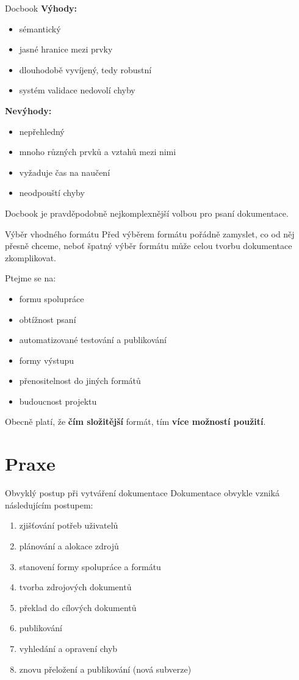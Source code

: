\documentclass[12pt]{beamer}
\begin{document}
	\begin{frame}{Docbook}
	\textbf{Výhody:}
	\begin{itemize}
		\item sémantický
		\item jasné hranice mezi prvky
		\item dlouhodobě vyvíjený, tedy robustní
		\item systém validace nedovolí chyby
	\end{itemize}	
	\textbf{Nevýhody:}
	\begin{itemize}
		\item nepřehledný
		\item mnoho různých prvků a vztahů mezi nimi
		\item vyžaduje čas na naučení
		\item neodpouští chyby
	\end{itemize}				
	Docbook je pravděpodobně nejkomplexnější volbou pro psaní dokumentace.
	\end{frame}

	\begin{frame}{Výběr vhodného formátu}
	Před výběrem formátu pořádně zamyslet, co od něj přesně chceme, neboť špatný výběr formátu může celou tvorbu dokumentace zkomplikovat.

	Ptejme se na:
	
	\begin{itemize}
		\item formu spolupráce
		\item obtížnost psaní
		\item automatizované testování a publikování
		\item formy výstupu
		\item přenositelnost do jiných formátů
		\item budoucnost projektu
	\end{itemize}
	Obecně platí, že \textbf{čím složitější} formát, tím \textbf{více možností použití}.
	\end{frame}

	\section{Praxe}	

	\begin{frame}{Obvyklý postup při vytváření dokumentace}
	Dokumentace obvykle vzniká následujícím postupem:
			\begin{enumerate}
				\item zjišťování potřeb uživatelů
				\item plánování a alokace zdrojů
				\item stanovení formy spolupráce a formátu
				\item tvorba zdrojových dokumentů
				\item překlad do cílových dokumentů
				\item publikování
				\item vyhledání a opravení chyb
				\item znovu přeložení a publikování (nová subverze)
			\end{enumerate}
	\end{frame}
\end{document}
